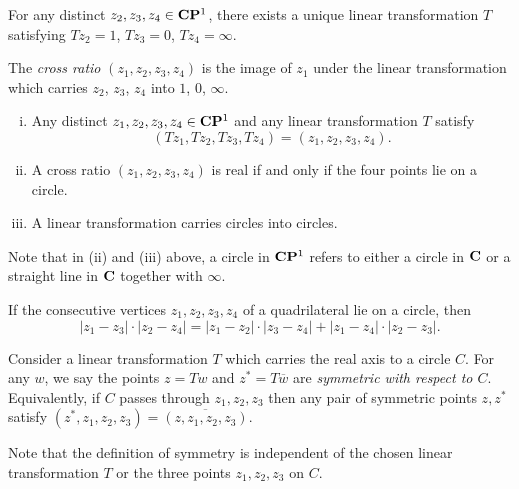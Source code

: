 \begin{proposition}
  For any distinct $z_2, z_3, z_4 \in \mathbf{C}\mathbf{P}^1$, there exists a unique linear transformation $T$ satisfying $T z_2 = 1$, $T z_3 = 0$, $T z_4 = \infty$.
\end{proposition}

\begin{definition}
  The \emph{cross ratio} $(z_1, z_2, z_3, z_4)$ is the image of $z_1$ under the linear transformation which carries $z_2$, $z_3$, $z_4$ into $1$, $0$, $\infty$.
\end{definition}

\begin{proposition}
  \mbox{}
  \begin{enumerate}[(i)]
  \item Any distinct $z_1, z_2, z_3, z_4 \in \mathbf{C}\mathbf{P}^1$ and any linear transformation $T$ satisfy
    \[
    (T z_1, T z_2, T z_3, T z_4) = (z_1, z_2, z_3, z_4).
    \]
  \item A cross ratio $(z_1, z_2, z_3, z_4)$ is real if and only if the four points lie on a circle.
    \item A linear transformation carries circles into circles.
  \end{enumerate}
\end{proposition}

Note that in (ii) and (iii) above, a circle in $\mathbf{C}\mathbf{P}^1$ refers to either a circle in $\mathbf{C}$ or a straight line in $\mathbf{C}$ together with $\infty$.

\begin{proposition}
  If the consecutive vertices $z_1, z_2, z_3, z_4$ of a quadrilateral lie on a circle, then
  \[
  |z_1 - z_3| \cdot |z_2 - z_4| = |z_1 - z_2| \cdot |z_3 - z_4| + |z_1 - z_4| \cdot |z_2 - z_3|.
  \]
\end{proposition}

\begin{definition}
  Consider a linear transformation $T$ which carries the real axis to a circle $C$. For any $w$, we say the points $z = T w$ and $z^\ast = T \overline{w}$ are \emph{symmetric with respect to $C$}. Equivalently, if $C$ passes through $z_1, z_2, z_3$ then any pair of symmetric points $z, z^\ast$ satisfy $(z^\ast, z_1, z_2, z_3) = \overline{(z, z_1, z_2, z_3)}$.
\end{definition}

Note that the definition of symmetry is independent of the chosen linear transformation $T$ or the three points $z_1, z_2, z_3$ on $C$.


